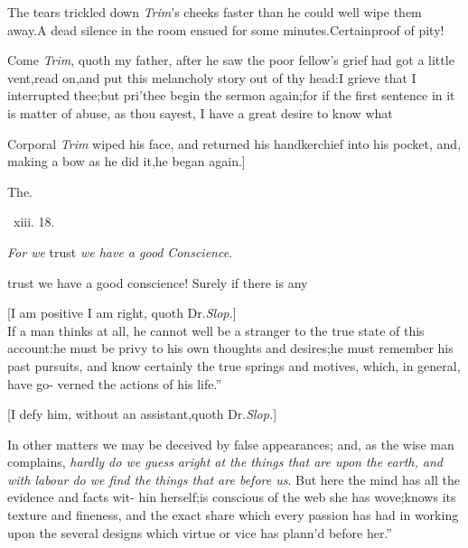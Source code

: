 \documentclass{article}
\begin{document}
\tsh The tears trickled down \textit{Trim}’s cheeks faster
than he could well wipe them away.\tsk A dead silence in the room
ensued for some minutes.\tsh Certain\break proof of pity!

Come \textit{Trim}, quoth my father, after he saw the poor
fellow’s grief had got a little vent,\tsk read
on,\tsk and put this melancholy story out of thy head:\tsk I
grieve that I interrupted thee;\tsk but pri’thee begin the sermon
again;\tsk for if the first sentence in it is matter of abuse, as
thou sayest, I have a great desire to know what\break 
{}

Corporal \textit{Trim} wiped his face, and returned his
handkerchief into his pocket, and, making a bow as he did
it,\tsk he began again.]

\bigskip
\centerline{The\quad {}.}
\bigskip
\centerline{\, xiii. 18.}
\tsh \textit{For we} trust \textit{we have a good}\break
\textit{Conscience}.\tsh

trust we have a good conscience! Surely if there is any\break
{}

[I am positive I am right, quoth Dr.\@ \textit{Slop.}]\\
\newpage
\lqq If a man thinks at all, he cannot\break
\lqq well be a stranger to the true state of\break
\lqq this account:\tsk he must be privy to\break
\lqq his own thoughts and desires;\tsh he\break
\lqq must remember his past pursuits, and\break
\lqq know certainly the true springs and\break
\lqq motives, which, in general, have go-\break
\lqq verned the actions of his life.”

[I defy him, without an assistant,\break quoth Dr.\@ \textit{Slop.}]

\indent\lqq In other matters we may be deceived\break
\lqq by false appearances; and, as the wise\break
\lqq man complains, \textit{hardly do we guess}\break
\lqq\textit{aright at the things that are upon the}\break
\lqq\textit{earth, and with labour do we find the}\break
\lqq\textit{things that are before us}. But here the\break
\lqq mind has all the evidence and facts wit-\break
\lqq hin herself;\tsk is conscious of the web\break
\lqq she has wove;\tsk knows its texture and
\lqq fineness, and the exact share which\break
\lqq every passion has had in working upon\break
\lqq the several designs which virtue or vice\break
\lqq has plann’d before her.”
\end{document}
